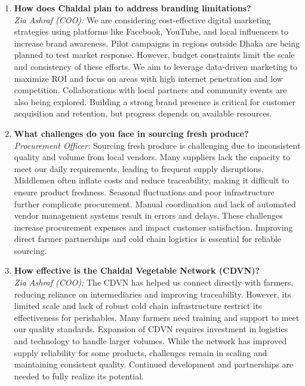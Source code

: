 \documentclass[12pt,a4paper]{article}
\begin{document}
\begin{enumerate}
        \item \textbf{How does Chaldal plan to address branding limitations?} \\
        \textit{Zia Ashraf (COO):} We are considering cost-effective digital marketing strategies using platforms like Facebook, YouTube, and local influencers to increase brand awareness. Pilot campaigns in regions outside Dhaka are being planned to test market response. However, budget constraints limit the scale and consistency of these efforts. We aim to leverage data-driven marketing to maximize ROI and focus on areas with high internet penetration and low competition. Collaborations with local partners and community events are also being explored. Building a strong brand presence is critical for customer acquisition and retention, but progress depends on available resources.

        \item \textbf{What challenges do you face in sourcing fresh produce?} \\
        \textit{Procurement Officer:} Sourcing fresh produce is challenging due to inconsistent quality and volume from local vendors. Many suppliers lack the capacity to meet our daily requirements, leading to frequent supply disruptions. Middlemen often inflate costs and reduce traceability, making it difficult to ensure product freshness. Seasonal fluctuations and poor infrastructure further complicate procurement. Manual coordination and lack of automated vendor management systems result in errors and delays. These challenges increase procurement expenses and impact customer satisfaction. Improving direct farmer partnerships and cold chain logistics is essential for reliable sourcing.

        \item \textbf{How effective is the Chaldal Vegetable Network (CDVN)?} \\
        \textit{Zia Ashraf (COO):} The CDVN has helped us connect directly with farmers, reducing reliance on intermediaries and improving traceability. However, its limited scale and lack of robust cold chain infrastructure restrict its effectiveness for perishables. Many farmers need training and support to meet our quality standards. Expansion of CDVN requires investment in logistics and technology to handle larger volumes. While the network has improved supply reliability for some products, challenges remain in scaling and maintaining consistent quality. Continued development and partnerships are needed to fully realize its potential.


\end{enumerate}
\end{document}
